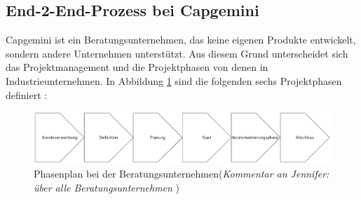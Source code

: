 \subsection{End-2-End-Prozess bei Capgemini}
Capgemini ist ein Beratungsunternehmen, das keine eigenen Produkte entwickelt, sondern andere Unternehmen unterstützt. Aus diesem Grund unterscheidet sich das Projektmanagement und die Projektphasen von denen in Industrieunternehmen. In Abbildung \ref{Projektmanagment_Campgeini} sind die folgenden sechs Projektphasen definiert \cite{wegmann2006projektmanagement}:
\begin{figure}[h!]
	\begin{center}
		\includegraphics[width=12cm]{Projektmanagement_Capgemini .png}
		\caption{Phasenplan bei der Beratungsunternehmen(\textit{Kommentar an Jennifer: über alle Beratungsunternehmen} ) \cite{wegmann2006projektmanagement}}
		\label{Projektmanagment_Campgeini}
	\end{center}
\end{figure}
